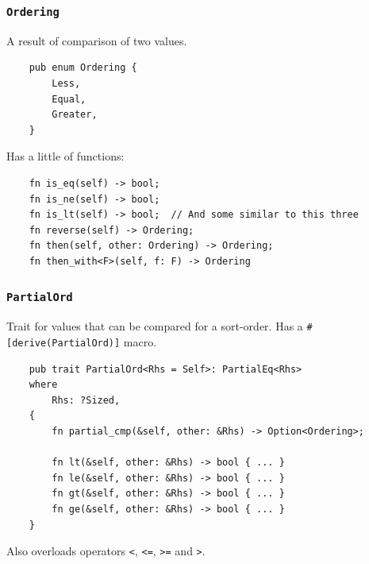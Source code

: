 \documentclass[aspectratio=1610,t]{beamer}
\begin{document}

\begin{frame}[fragile]
\frametitle{\texttt{Ordering}}
A result of comparison of two values.

\begin{verbatim}
    pub enum Ordering {
        Less,
        Equal,
        Greater,
    }
\end{verbatim}

Has a little of functions:

\begin{verbatim}
    fn is_eq(self) -> bool;
    fn is_ne(self) -> bool;
    fn is_lt(self) -> bool;  // And some similar to this three
    fn reverse(self) -> Ordering;
    fn then(self, other: Ordering) -> Ordering;
    fn then_with<F>(self, f: F) -> Ordering
\end{verbatim}
\end{frame}


\begin{frame}[fragile]
\frametitle{\texttt{PartialOrd}}
Trait for values that can be compared for a sort-order. Has a \texttt{\#[derive(PartialOrd)]} macro.

\begin{verbatim}
    pub trait PartialOrd<Rhs = Self>: PartialEq<Rhs> 
    where
        Rhs: ?Sized, 
    {
        fn partial_cmp(&self, other: &Rhs) -> Option<Ordering>;

        fn lt(&self, other: &Rhs) -> bool { ... }
        fn le(&self, other: &Rhs) -> bool { ... }
        fn gt(&self, other: &Rhs) -> bool { ... }
        fn ge(&self, other: &Rhs) -> bool { ... }
    }
\end{verbatim}

Also overloads operators \texttt{<}, \texttt{<=}, \texttt{>=} and \texttt{>}.
\end{frame}

\end{document}
